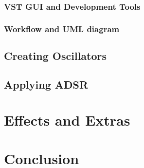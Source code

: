 \documentclass[12pt]{article}
\begin{document}
\subsubsection{VST GUI and Development Tools}

\subsubsection{Workflow and UML diagram}

\subsection{Creating Oscillators}

\subsection{Applying ADSR}

\section{Effects and Extras}

\section{Conclusion}




\end{document}
